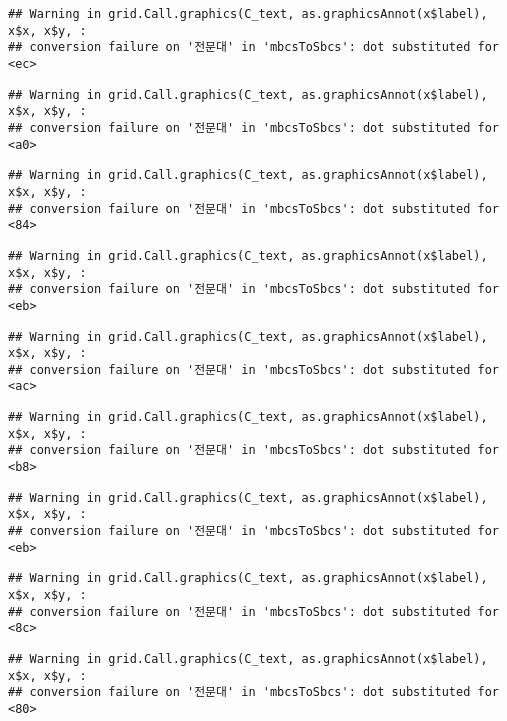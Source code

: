 \documentclass[
]{article}
\begin{document}
\begin{verbatim}
## Warning in grid.Call.graphics(C_text, as.graphicsAnnot(x$label), x$x, x$y, :
## conversion failure on '전문대' in 'mbcsToSbcs': dot substituted for <ec>
\end{verbatim}

\begin{verbatim}
## Warning in grid.Call.graphics(C_text, as.graphicsAnnot(x$label), x$x, x$y, :
## conversion failure on '전문대' in 'mbcsToSbcs': dot substituted for <a0>
\end{verbatim}

\begin{verbatim}
## Warning in grid.Call.graphics(C_text, as.graphicsAnnot(x$label), x$x, x$y, :
## conversion failure on '전문대' in 'mbcsToSbcs': dot substituted for <84>
\end{verbatim}

\begin{verbatim}
## Warning in grid.Call.graphics(C_text, as.graphicsAnnot(x$label), x$x, x$y, :
## conversion failure on '전문대' in 'mbcsToSbcs': dot substituted for <eb>
\end{verbatim}

\begin{verbatim}
## Warning in grid.Call.graphics(C_text, as.graphicsAnnot(x$label), x$x, x$y, :
## conversion failure on '전문대' in 'mbcsToSbcs': dot substituted for <ac>
\end{verbatim}

\begin{verbatim}
## Warning in grid.Call.graphics(C_text, as.graphicsAnnot(x$label), x$x, x$y, :
## conversion failure on '전문대' in 'mbcsToSbcs': dot substituted for <b8>
\end{verbatim}

\begin{verbatim}
## Warning in grid.Call.graphics(C_text, as.graphicsAnnot(x$label), x$x, x$y, :
## conversion failure on '전문대' in 'mbcsToSbcs': dot substituted for <eb>
\end{verbatim}

\begin{verbatim}
## Warning in grid.Call.graphics(C_text, as.graphicsAnnot(x$label), x$x, x$y, :
## conversion failure on '전문대' in 'mbcsToSbcs': dot substituted for <8c>
\end{verbatim}

\begin{verbatim}
## Warning in grid.Call.graphics(C_text, as.graphicsAnnot(x$label), x$x, x$y, :
## conversion failure on '전문대' in 'mbcsToSbcs': dot substituted for <80>
\end{verbatim}
\end{document}
